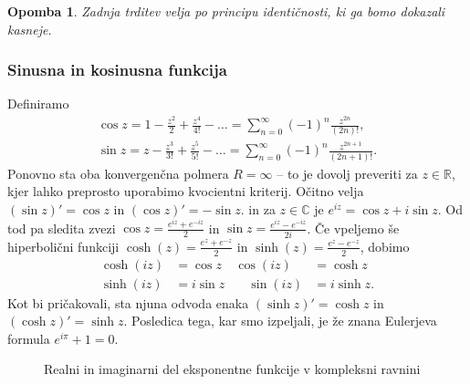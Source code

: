 \documentclass[10pt, a4paper]{article}
\newtheorem*{opomba}{Opomba}
\newcommand{\R}{\mathbb {R}}
\newcommand{\C}{\mathbb {C}}
\begin{document}
\begin{opomba}
  Zadnja trditev velja po principu identičnosti, ki ga bomo dokazali kasneje. 
\end{opomba}

\subsubsection{Sinusna in kosinusna funkcija} 

Definiramo 
\begin{gather*}
  \cos z = 1 - \frac{z^2}{2} + \frac{z^4}{4!} - \dots = \sum_{n = 0}^\infty (-1)^n \frac{z^{2n}}{(2n)!},\\
  \sin z = z - \frac{z^3}{3!} + \frac{z^5}{5!} - \dots = \sum_{n = 0}^\infty (-1)^n \frac{z^{2n + 1}}{(2n + 1)!}.
\end{gather*}
Ponovno sta oba konvergenčna polmera $R = \infty$ -- to 
je dovolj preveriti za $z \in \R$, kjer lahko preprosto uporabimo kvocientni kriterij.
Očitno velja $(\sin z)' = \cos z$ in $(\cos z)' = - \sin z$.
in za $z \in \C$ je $e^{iz} = \cos z + i \sin z$.
Od tod pa sledita zvezi $\cos z = \frac{e^{iz} + e^{-iz}}{2}$ in $\sin z = \frac{e^{iz} - e^{-iz}}{2i}$.
Če vpeljemo še hiperbolični funkciji $\cosh (z) = \frac{e^z + e^{-z}}{2}$ in 
$\sinh (z) = \frac{e^z - e^{-z}}{2}$, dobimo 
\begin{align*}
  \cosh (iz) &= \cos z & \cos(iz) &= \cosh z\\
  \sinh (iz) &= i \sin z & \quad \sin(iz) &= i \sinh z.
\end{align*}
Kot bi pričakovali, sta njuna odvoda enaka $(\sinh z)' = \cosh z$ in $(\cosh z)' = \sinh z.$
Posledica tega, kar smo izpeljali, je že znana Eulerjeva formula $e^{i\pi} + 1 = 0$.

\begin{figure}[h!]%
  \centering
  \qquad
  \caption{Realni in imaginarni del eksponentne funkcije v kompleksni ravnini}%
\end{figure}
\end{document}
